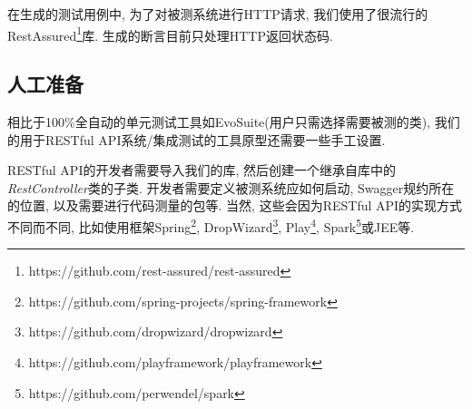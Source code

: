     在生成的测试用例中, 为了对被测系统进行HTTP请求, 我们使用了很流行的RestAssured\footnote{https://github.com/rest-assured/rest-assured}库. 生成的断言目前只处理HTTP返回状态码. 
    
    \subsection{人工准备}
    \label{4-6}
    相比于100\%全自动的单元测试工具如EvoSuite(用户只需选择需要被测的类), 我们的用于RESTful API系统/集成测试的工具原型还需要一些手工设置. 
    
    RESTful API的开发者需要导入我们的库, 然后创建一个继承自库中的\textit{RestController}类的子类. 开发者需要定义被测系统应如何启动, Swagger规约所在的位置, 以及需要进行代码测量的包等. 当然, 这些会因为RESTful API的实现方式不同而不同, 比如使用框架Spring\footnote{ https://github.com/spring-projects/spring-framework}, DropWizard\footnote{https://github.com/dropwizard/dropwizard}, Play\footnote{ https://github.com/playframework/playframework}, Spark\footnote{ https://github.com/perwendel/spark}或JEE等. 

